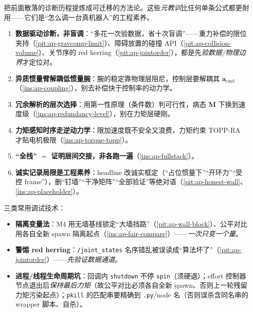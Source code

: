 把前面散落的诊断历程提炼成可迁移的方法论。这些\emph{元教训}比任何单条公式都更耐用——它们是“怎么调一台真机器人”的工程素养。

\begin{insight}[六条元教训]\label{ins:ap-metalessons}
\begin{enumerate}
  \item \textbf{数据驱动诊断，非盲调}：“多花一次验数据，省十次盲调”——重力补偿的限位夹持（\cref{pit:ap-gravcomp-limit}）、障碍放置的碰撞 API（\cref{pit:ap-collision-volume}）、关节序的 red herring（\cref{pit:ap-jointorder}），都是先\emph{验数据/物理边界}才定位对。
  \item \textbf{异质惯量臂解耦低惯量腕}：腕的稳定靠物理层阻尼，控制层要解耦其 $\mathbf{a}_{\mathrm{cmd}}$（\cref{ins:ap-coupling}），别去补偿快于控制率的动力学。
  \item \textbf{冗余解析的层次选择}：用第一性原理（条件数）判可行性，病态 $\mathbf{M}$ 下换到速度级（\cref{ins:ap-redundancy-level}），别在力矩层硬刚。
  \item \textbf{力矩感知时序走逆动力学}：限加速度既不安全又浪费，力矩约束 TOPP-RA 才贴电机极限（\cref{ins:ap-torque-topp}）。
  \item \textbf{“全栈” $=$ 证明层间交接，非各跑一遍}（\cref{ins:ap-fullstack}）。
  \item \textbf{诚实记录局限是工程素养}：headline 改诚实框定（“占位惯量下”“开环力”“受控 frame”），删“钉墙”“干净矩阵”“全部验证”等绝对语（\cref{pit:ap-honest-wall}、\cref{ins:ap-placeholder}）。
\end{enumerate}
\end{insight}

\begin{insight}\label{ins:ap-techniques}
三类常用调试技术：
\begin{itemize}
  \item \textbf{隔离变量法}：M4 用无墙基线锁定“大墙挡路”（\cref{pit:ap-wall-block}）、公平对比用各自全新 spawn 隔离起点（\cref{ins:ap-fair-compare}）——\emph{一次只变一个量}。
  \item \textbf{警惕 red herring}：\texttt{/joint\_states} 名序错乱被误读成“算法坏了”（\cref{pit:ap-jointorder}）——\emph{先验证数据通道}。
  \item \textbf{进程/线程生命周期坑}：回调内 \texttt{shutdown} 不停 \texttt{spin}（须硬退）；effort 控制器节点退出后\emph{保持最后力矩}（故公平对比必须各自全新 spawn、否则上一轮残留力矩污染起点）；\texttt{pkill} 的匹配串要精确到 \texttt{.py}/node 名（否则误杀含同名串的 wrapper 脚本、自杀）。
\end{itemize}
\end{insight}

